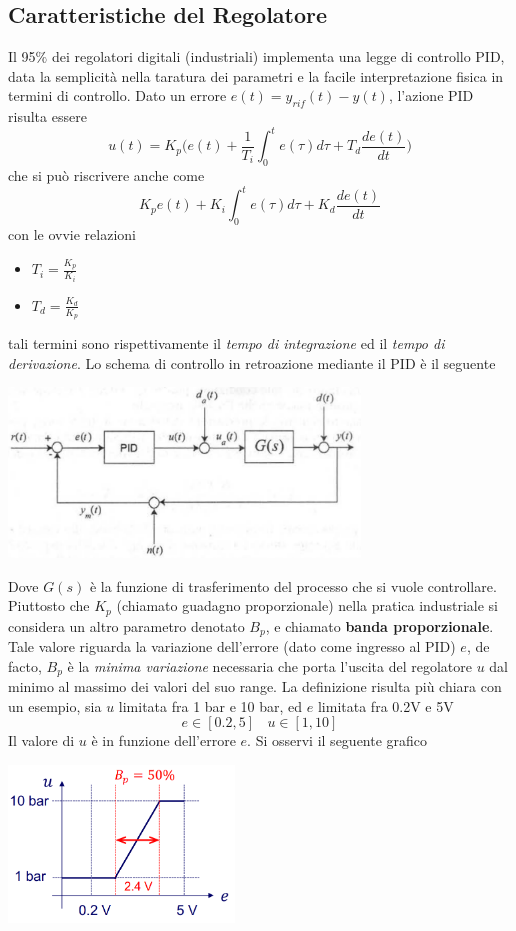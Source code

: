 \documentclass[10pt, letterpaper]{report}
\begin{document}
\subsection{Caratteristiche del Regolatore}
Il 95$\%$ dei regolatori digitali (industriali) implementa una legge di controllo PID, data la semplicità nella taratura dei parametri e la facile interpretazione fisica in termini di controllo. Dato un errore $e(t)=y_{rif}(t)-y(t)$, l'azione PID risulta essere 
$$ 
u(t)=K_p\Big(   e(t)+\frac{1}{T_i}\int_0^te(\tau)d\tau + T_d\frac{de(t)}{dt}    \Big)
$$
che si può riscrivere anche come 
$$
K_pe(t)+K_i\int_0^te(\tau)d\tau + K_d\frac{de(t)}{dt} 
$$
con le ovvie relazioni \begin{itemize}\item$T_i=\frac{K_p}{K_i}$\item $T_d=\frac{K_d}{K_p}$\end{itemize} tali termini sono rispettivamente il \textit{tempo di integrazione} ed il  \textit{tempo di derivazione}.\acc 
Lo schema di controllo in retroazione mediante il PID è il seguente
\begin{center}
    \includegraphics[width=0.7\textwidth]{images/schemaControlloPID.png} 
\end{center}
Dove $G(s)$ è la funzione di trasferimento del processo che si vuole controllare.
\acc
Piuttosto che $K_p$ (chiamato guadagno proporzionale) nella pratica industriale si considera un altro parametro denotato $B_p$, e chiamato \textbf{banda proporzionale}. Tale valore riguarda la variazione dell'errore (dato come ingresso al PID) $e$, de facto, $B_p$ è la \textit{minima variazione} necessaria che porta l'uscita del regolatore $u$ dal minimo al massimo dei valori del suo range.\acc 
La definizione risulta più chiara con un esempio, sia $u$ limitata fra 1 bar e 10 bar, ed $e$ limitata fra 0.2V e 5V 
$$ e\in [0.2,5]\ \ \ \ u\in[1,10]$$
Il valore di $u$ è in funzione dell'errore $e$. Si osservi il seguente grafico
\begin{center}
    \includegraphics[width=0.45\textwidth]{images/bandaproporzionale1.png} 
\end{center}
\end{document}
